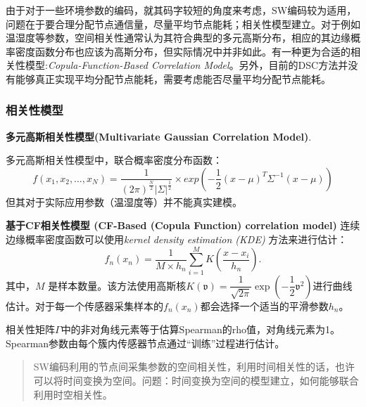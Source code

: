 由于对于一些环境参数的编码，就其码字较短的角度来考虑，SW编码较为适用，问题在于\textcolor[rgb]{1,0,0}{要合理分配节点通信量，尽量平均节点能耗；相关性模型建立}。对于例如温湿度等参数，空间相关性通常认为其符合典型的多元高斯分布，相应的其边缘概率密度函数分布也应该为高斯分布，但实际情况中并非如此。有一种更为合适的相关性模型:\emph{\textcolor[rgb]{1,0,0}{Copula-Function-Based Correlation Model}}。另外，目前的DSC方法并没有能够真正实现平均分配节点能耗，需要考虑能否尽量平均分配节点能耗。

\subsubsection{相关性模型}
\textbf{多元高斯相关性模型(Multivariate Gaussian Correlation Model)}.

多元高斯相关性模型中，联合概率密度分布函数：
\begin{equation}
    f(x_1,x_2,\dots,x_N) = \dfrac{1}{(2\pi)^{\frac{N}{2}}|\Sigma|^{\frac{1}{2}}} \times exp\left( -\dfrac{1}{2} (x-\mu)^T \Sigma^{-1}(x-\mu) \right)
    \label{eq1.4}
\end{equation}
但其对于实际应用参数（温湿度等）并不能真实建模。

\textbf{基于CF相关性模型 (CF-Based (Copula Function) correlation model)}
连续边缘概率密度函数可以使用\emph{kernel density estimation (KDE)} 方法来进行估计：
\begin{equation}
    f_n(x_n) = \dfrac{1}{M \times h_n} \sum_{i=1}^{M}K\left( \dfrac{x-x_i}{h_n} \right).
    \label{eq1.11}
\end{equation}
其中，$M$ 是样本数量。该方法使用高斯核$K(\mathfrak{v}) = \dfrac{1}{\sqrt{2\pi}}\exp\left(-\dfrac{1}{2}\mathfrak{v}^2\right)$进行曲线估计。对于每一个传感器采集样本的$f_n(x_n)$都会选择一个适当的平滑参数$h_n$。

相关性矩阵$\Gamma$中的非对角线元素等于估算Spearman的rho值，对角线元素为1。Spearman参数由每个簇内传感器节点通过“训练”过程进行估计。

\begin{quotation}
    SW编码利用的节点间采集参数的空间相关性，利用时间相关性的话，也许可以将时间变换为空间。问题：时间变换为空间的模型建立，如何能够联合利用时空相关性。
\end{quotation}




